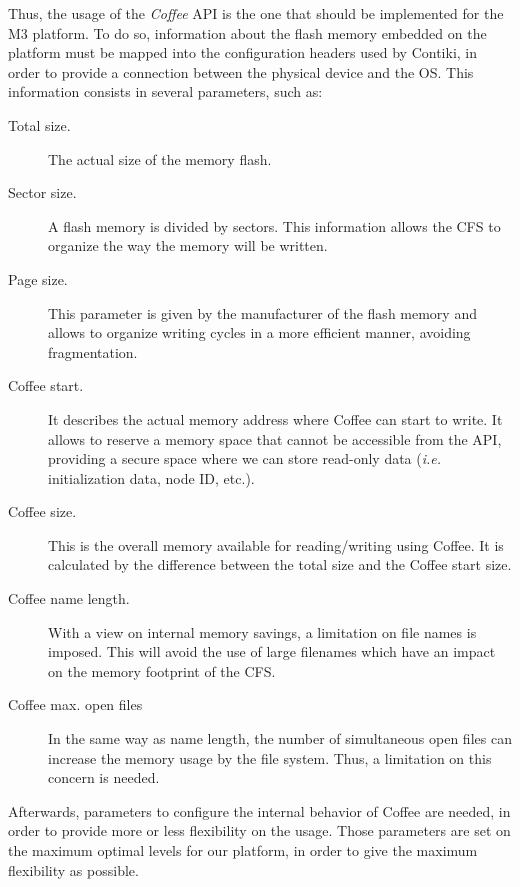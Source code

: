 Thus, the usage of the \textit{Coffee} API is the one that should be implemented for the M3 platform.
To do so, information about the flash memory embedded on the platform must be mapped into the configuration headers used by Contiki, in order to provide a connection between the physical device and the OS.
This information consists in several parameters, such as:
\begin{description}
	\item[Total size.] The actual size of the memory flash.
	\item[Sector size.] A flash memory is divided by sectors. This information allows the CFS to organize the way the memory will be written.
	\item[Page size.] This parameter is given by the manufacturer of the flash memory and allows to organize writing cycles in a more efficient manner, avoiding fragmentation.
	\item[Coffee start.] It describes the actual memory address where Coffee can start to write. It allows to reserve a memory space that cannot be accessible from the API, providing a secure space where we can store read-only data (\textit{i.e.} initialization data, node ID, etc.).
	\item[Coffee size.] This is the overall memory available for reading/writing using Coffee. It is calculated by the difference between the total size and the Coffee start size.
	\item[Coffee name length.] With a view on internal memory savings, a limitation on file names is imposed. This will avoid the use of large filenames which have an impact on the memory footprint of the CFS.
	\item[Coffee max. open files] In the same way as name length, the number of simultaneous open files can increase the memory usage by the file system. Thus, a limitation on this concern is needed.
\end{description}

Afterwards, parameters to configure the internal behavior of Coffee are needed, in order to provide more or less flexibility on the usage.
Those parameters are set on the maximum optimal levels for our platform, in order to give the maximum flexibility as possible.


